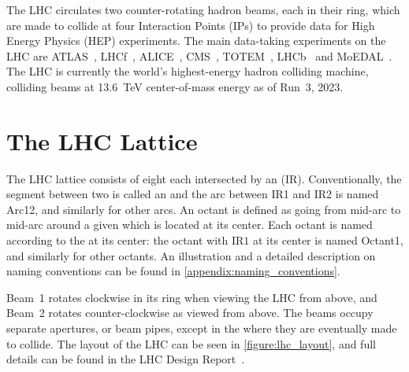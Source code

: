The LHC circulates two counter-rotating hadron beams, each in their ring, which are made to collide at four Interaction Points (IPs) to provide data for High Energy Physics (HEP) experiments.
The main data-taking experiments on the LHC are ATLAS~\cite{Website:ATLAS,Website:ATLAS_CDS}, LHCf~\cite{Website:LHCf,Website:LHCf_CDS}, ALICE~\cite{Website:ALICE,Website:ALICE_CDS}, CMS~\cite{Website:CMS,Website:CMS_CDS}, TOTEM~\cite{Website:TOTEM,Website:TOTEM_CDS}, LHCb~\cite{Website:LHCb,Website:LHCb_CDS} and MoEDAL~\cite{Website:MOEDAL,Website:MOEDAL_CDS}.
The LHC is currently the world's highest-energy hadron colliding machine, colliding beams at \qty{13.6}{\tera\electronvolt} center-of-mass energy as of Run~\num{3}, \num{2023}.


\section{The LHC Lattice}
\label{section:lhc_lattice}

The LHC lattice consists of eight  each intersected by an  (IR).
Conventionally, the segment between two \IRs is called an  and the arc between IR1 and IR2 is named Arc12, and similarly for other arcs.
An octant is defined as going from mid-arc to mid-arc around a given \IR which is located at its center.
Each octant is named according to the \IR at its center: the octant with \(\mathrm{IR1}\) at its center is named Octant1, and similarly for other octants.
An illustration and a detailed description on naming conventions can be found in \cref{appendix:naming_conventions}.

Beam~1 rotates clockwise in its ring when viewing the LHC from above, and Beam~2 rotates counter-clockwise as viewed from above.
The beams occupy separate apertures, or beam pipes, except in the \IRs where they are eventually made to collide.
The layout of the LHC can be seen in \cref{figure:lhc_layout}, and full details can be found in the LHC Design Report~\cite{BOOK:Bruning:LHC_Design_Report_Main_Ring,BOOK:Bruning:LHC_Design_Report_Infrastructure,BOOK:Benedikt:LHC_Design_Report_Injector_Chain}.

